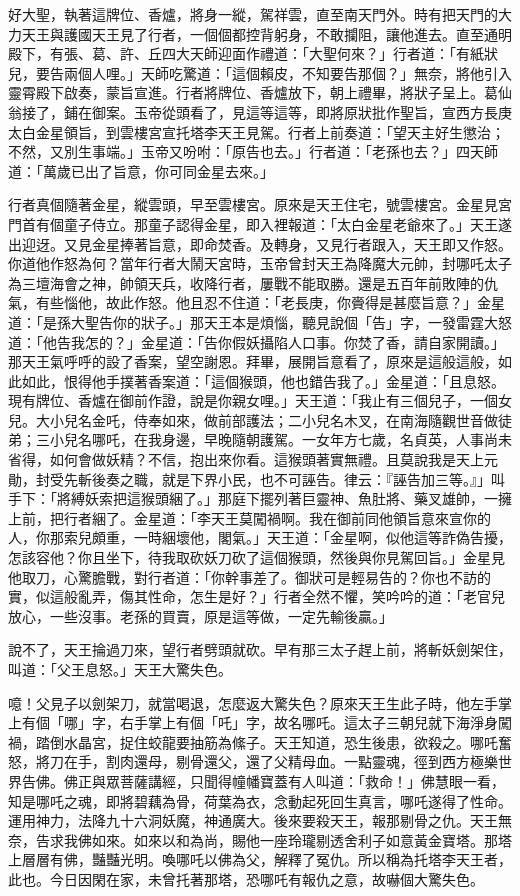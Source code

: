 好大聖，執著這牌位、香爐，將身一縱，駕祥雲，直至南天門外。時有把天門的大力天王與護國天王見了行者，一個個都控背躬身，不敢攔阻，讓他進去。直至通明殿下，有張、葛、許、丘四大天師迎面作禮道：「大聖何來？」行者道：「有紙狀兒，要告兩個人哩。」天師吃驚道：「這個賴皮，不知要告那個？」無奈，將他引入靈霄殿下啟奏，蒙旨宣進。行者將牌位、香爐放下，朝上禮畢，將狀子呈上。葛仙翁接了，鋪在御案。玉帝從頭看了，見這等這等，即將原狀批作聖旨，宣西方長庚太白金星領旨，到雲樓宮宣托塔李天王見駕。行者上前奏道：「望天主好生懲治；不然，又別生事端。」玉帝又吩咐：「原告也去。」行者道：「老孫也去？」四天師道：「萬歲已出了旨意，你可同金星去來。」

行者真個隨著金星，縱雲頭，早至雲樓宮。原來是天王住宅，號雲樓宮。金星見宮門首有個童子侍立。那童子認得金星，即入裡報道：「太白金星老爺來了。」天王遂出迎迓。又見金星捧著旨意，即命焚香。及轉身，又見行者跟入，天王即又作怒。你道他作怒為何？當年行者大鬧天宮時，玉帝曾封天王為降魔大元帥，封哪吒太子為三壇海會之神，帥領天兵，收降行者，屢戰不能取勝。還是五百年前敗陣的仇氣，有些惱他，故此作怒。他且忍不住道：「老長庚，你賫得是甚麼旨意？」金星道：「是孫大聖告你的狀子。」那天王本是煩惱，聽見說個「告」字，一發雷霆大怒道：「他告我怎的？」金星道：「告你假妖攝陷人口事。你焚了香，請自家開讀。」那天王氣呼呼的設了香案，望空謝恩。拜畢，展開旨意看了，原來是這般這般，如此如此，恨得他手撲著香案道：「這個猴頭，他也錯告我了。」金星道：「且息怒。現有牌位、香爐在御前作證，說是你親女哩。」天王道：「我止有三個兒子，一個女兒。大小兒名金吒，侍奉如來，做前部護法；二小兒名木叉，在南海隨觀世音做徒弟；三小兒名哪吒，在我身邊，早晚隨朝護駕。一女年方七歲，名貞英，人事尚未省得，如何會做妖精？不信，抱出來你看。這猴頭著實無禮。且莫說我是天上元勛，封受先斬後奏之職，就是下界小民，也不可誣告。律云：『誣告加三等。』」叫手下：「將縛妖索把這猴頭綑了。」那庭下擺列著巨靈神、魚肚將、藥叉雄帥，一擁上前，把行者綑了。金星道：「李天王莫闖禍啊。我在御前同他領旨意來宣你的人，你那索兒頗重，一時綑壞他，閣氣。」天王道：「金星啊，似他這等詐偽告擾，怎該容他？你且坐下，待我取砍妖刀砍了這個猴頭，然後與你見駕回旨。」金星見他取刀，心驚膽戰，對行者道：「你幹事差了。御狀可是輕易告的？你也不訪的實，似這般亂弄，傷其性命，怎生是好？」行者全然不懼，笑吟吟的道：「老官兒放心，一些沒事。老孫的買賣，原是這等做，一定先輸後贏。」

說不了，天王掄過刀來，望行者劈頭就砍。早有那三太子趕上前，將斬妖劍架住，叫道：「父王息怒。」天王大驚失色。

噫！父見子以劍架刀，就當喝退，怎麼返大驚失色？原來天王生此子時，他左手掌上有個「哪」字，右手掌上有個「吒」字，故名哪吒。這太子三朝兒就下海淨身闖禍，踏倒水晶宮，捉住蛟龍要抽筋為絛子。天王知道，恐生後患，欲殺之。哪吒奮怒，將刀在手，割肉還母，剔骨還父，還了父精母血。一點靈魂，徑到西方極樂世界告佛。佛正與眾菩薩講經，只聞得幢幡寶蓋有人叫道：「救命！」佛慧眼一看，知是哪吒之魂，即將碧藕為骨，荷葉為衣，念動起死回生真言，哪吒遂得了性命。運用神力，法降九十六洞妖魔，神通廣大。後來要殺天王，報那剔骨之仇。天王無奈，告求我佛如來。如來以和為尚，賜他一座玲瓏剔透舍利子如意黃金寶塔。那塔上層層有佛，豔豔光明。喚哪吒以佛為父，解釋了冤仇。所以稱為托塔李天王者，此也。今日因閑在家，未曾托著那塔，恐哪吒有報仇之意，故嚇個大驚失色。

